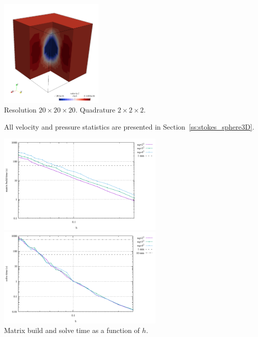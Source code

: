 \begin{center}
\includegraphics[width=5cm]{python_codes/fieldstone_82/results/sphere/w.png}\\
{\captionfont Resolution $20\times 20\times 20$. Quadrature $2\times 2 \times 2$.} 
\end{center}

All velocity and pressure statistics are presented in Section~\ref{ss:stokes_sphere3D}.

\begin{center}
\includegraphics[width=8cm]{python_codes/fieldstone_82/results/sphere/build.pdf}
\includegraphics[width=8cm]{python_codes/fieldstone_82/results/sphere/solve.pdf}\\
{\captionfont Matrix build and solve time as a function of $h$.}
\end{center}
